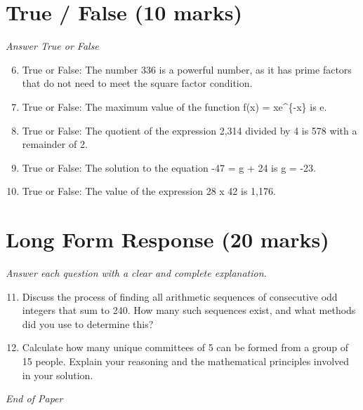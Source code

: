 \documentclass[12pt]{article}
\begin{document}
\section*{True / False (10 marks)}
\textit{Answer True or False}
\begin{enumerate}[label=\arabic*.]
\setcounter{enumi}{5}
\item True or False: The number 336 is a powerful number, as it has prime factors that do not need to meet the square factor condition.
\item True or False: The maximum value of the function f(x) = xe^\{-x\} is e.
\item True or False: The quotient of the expression 2,314 divided by 4 is 578 with a remainder of 2.
\item True or False: The solution to the equation -47 = g + 24 is g = -23.
\item True or False: The value of the expression 28 x 42 is 1,176.
\end{enumerate}

\section*{Long Form Response (20 marks)}
\textit{Answer each question with a clear and complete explanation.}
\begin{enumerate}[label=\arabic*.]
\setcounter{enumi}{10}
\item Discuss the process of finding all arithmetic sequences of consecutive odd integers that sum to 240. How many such sequences exist, and what methods did you use to determine this?
\item Calculate how many unique committees of 5 can be formed from a group of 15 people. Explain your reasoning and the mathematical principles involved in your solution.
\end{enumerate}

\vfill
\noindent\textit{End of Paper}
\end{document}
